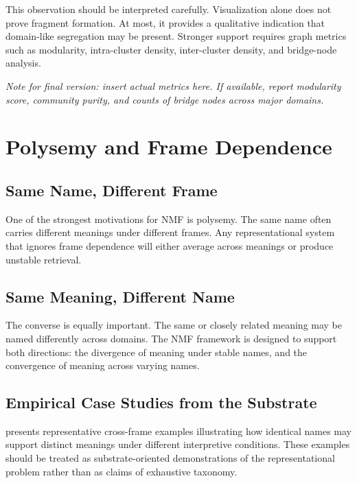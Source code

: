 \documentclass[11pt,a4paper]{article}
\begin{document}
This observation should be interpreted carefully. Visualization alone does not prove fragment formation. At most, it provides a qualitative indication that domain-like segregation may be present. Stronger support requires graph metrics such as modularity, intra-cluster density, inter-cluster density, and bridge-node analysis.

\textit{Note for final version: insert actual metrics here. If available, report modularity score, community purity, and counts of bridge nodes across major domains.}

\section{Polysemy and Frame Dependence}

\subsection{Same Name, Different Frame}

One of the strongest motivations for NMF is polysemy. The same name often carries different meanings under different frames. Any representational system that ignores frame dependence will either average across meanings or produce unstable retrieval.

\subsection{Same Meaning, Different Name}

The converse is equally important. The same or closely related meaning may be named differently across domains. The NMF framework is designed to support both directions: the divergence of meaning under stable names, and the convergence of meaning across varying names.

\subsection{Empirical Case Studies from the Substrate}

 presents representative cross-frame examples illustrating how identical names may support distinct meanings under different interpretive conditions. These examples should be treated as substrate-oriented demonstrations of the representational problem rather than as claims of exhaustive taxonomy.
\end{document}
